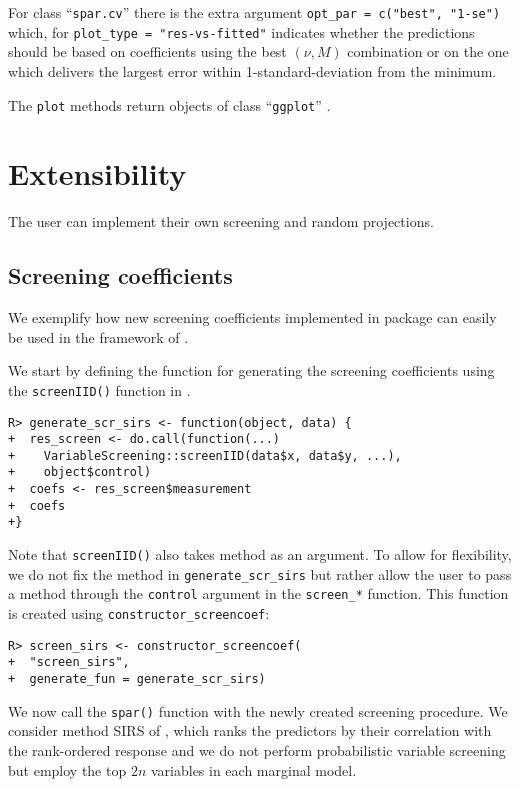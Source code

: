 \documentclass[
  article]{jss}
\begin{document}
For class ``\texttt{spar.cv}'' there is the extra argument
\texttt{opt\_par\ =\ c("best",\ "1-se")} which, for
\texttt{plot\_type\ =\ "res-vs-fitted"} indicates whether the
predictions should be based on coefficients using the best \((\nu, M)\)
combination or on the one which delivers the largest error within
1-standard-deviation from the minimum.

The \texttt{plot} methods return objects of class ``\texttt{ggplot}''
\citet{ggplotR}.

\section{Extensibility}\label{extensibility}

The user can implement their own screening and random projections.

\subsection{Screening coefficients}\label{sec-extensscrcoef}

We exemplify how new screening coefficients implemented in package
 can easily be used in the framework of
.

We start by defining the function for generating the screening
coefficients using the \texttt{screenIID()} function in
.

\begin{verbatim}
R> generate_scr_sirs <- function(object, data) {
+  res_screen <- do.call(function(...) 
+    VariableScreening::screenIID(data$x, data$y, ...), 
+    object$control)
+  coefs <- res_screen$measurement
+  coefs
+}
\end{verbatim}

Note that \texttt{screenIID()} also takes method as an argument. To
allow for flexibility, we do not fix the method in
\texttt{generate\_scr\_sirs} but rather allow the user to pass a method
through the \texttt{control} argument in the \texttt{screen\_*}
function. This function is created using
\texttt{constructor\_screencoef}:

\begin{verbatim}
R> screen_sirs <- constructor_screencoef(
+  "screen_sirs", 
+  generate_fun = generate_scr_sirs)
\end{verbatim}

We now call the \texttt{spar()} function with the newly created
screening procedure. We consider method SIRS of \citet{zhu2011model},
which ranks the predictors by their correlation with the rank-ordered
response and we do not perform probabilistic variable screening but
employ the top \(2n\) variables in each marginal model.
\end{document}
